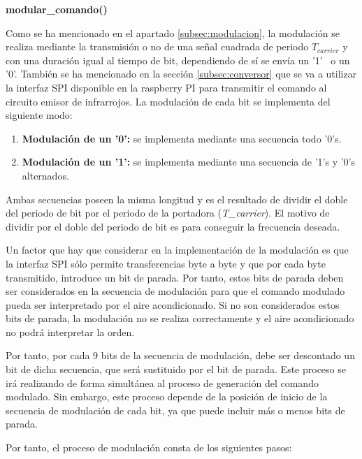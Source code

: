 \normalsize\textbf{modular\_comando()}\label{modulacion:comando}


Como se ha mencionado en el apartado \ref{subsec:modulacion}, la modulación se realiza mediante la transmisión o no de una señal cuadrada de periodo $T_{carrier}$ y con una duración igual al tiempo de bit, dependiendo de sí se envía un '1'~ o un '0'. También se ha mencionado en la sección \ref{subsec:conversor} que se va a utilizar la interfaz SPI disponible en la raspberry PI para transmitir el comando al circuito emisor de infrarrojos. La modulación de cada bit se implementa del siguiente modo:

\begin{enumerate}
 \item \textbf{Modulación de un '0':} se implementa mediante una secuencia todo '0's.
 \item \textbf{Modulación de un '1':} se implementa mediante una secuencia de '1's y '0's alternados.
\end{enumerate}

	Ambas secuencias poseen la misma longitud y es el resultado de dividir el doble del periodo de bit por el periodo de la portadora (\textit{T\_carrier}). El motivo de dividir por el doble del periodo de bit es para conseguir la frecuencia deseada.

	Un factor que hay que considerar en la implementación de la modulación es que la interfaz SPI sólo permite transferencias byte a byte y que por cada byte transmitido, introduce un bit de parada. Por tanto, estos bits de parada deben ser considerados en la secuencia de modulación para que el comando modulado pueda ser interpretado por el aire acondicionado. Si no son considerados estos bits de parada, la modulación no se realiza correctamente y el aire acondicionado no podrá interpretar la orden.

	Por tanto, por cada 9 bits de la secuencia de modulación, debe ser descontado un bit de dicha secuencia, que será sustituido por el bit de parada. Este proceso se irá realizando de forma simultánea al proceso de generación del comando modulado. Sin embargo, este proceso depende de la posición de inicio de la secuencia de modulación de cada bit, ya que puede incluir más o menos bits de parada. 

\noindent Por tanto, el proceso de modulación consta de los siguientes pasos:

